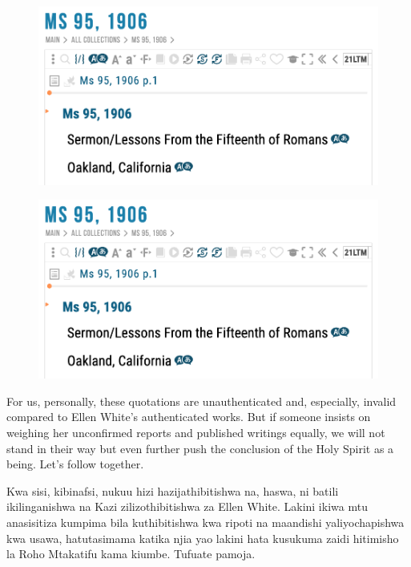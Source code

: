 \begin{figure}
    \centering
    \includegraphics[width=1\linewidth]{images/sermons-and-talks.png}
    \label{fig:enter-label}
\end{figure}


\begin{figure}
    \centering
    \includegraphics[width=1\linewidth]{images/sermons-and-talks.png}
    \label{fig:enter-label}
\end{figure}


For us, personally, these quotations are unauthenticated and, especially, invalid compared to Ellen White’s authenticated works. But if someone insists on weighing her unconfirmed reports and published writings equally, we will not stand in their way but even further push the conclusion of the Holy Spirit as a being. Let’s follow together.


Kwa sisi, kibinafsi, nukuu hizi hazijathibitishwa na, haswa, ni batili ikilinganishwa na Kazi zilizothibitishwa za Ellen White. Lakini ikiwa mtu anasisitiza kumpima bila kuthibitishwa kwa ripoti na maandishi yaliyochapishwa kwa usawa, hatutasimama katika njia yao lakini hata kusukuma zaidi hitimisho la Roho Mtakatifu kama kiumbe. Tufuate pamoja.


